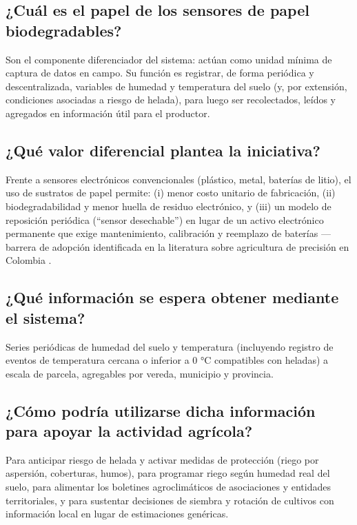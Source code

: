 \documentclass[11pt,a4paper]{article}
\begin{document}
\subsection{¿Cuál es el papel de los sensores de papel biodegradables?}
Son el componente diferenciador del sistema: actúan como unidad mínima de captura de datos en campo. Su función es registrar, de forma periódica y descentralizada, variables de humedad y temperatura del suelo (y, por extensión, condiciones asociadas a riesgo de helada), para luego ser recolectados, leídos y agregados en información útil para el productor.

\subsection{¿Qué valor diferencial plantea la iniciativa?}
Frente a sensores electrónicos convencionales (plástico, metal, baterías de litio), el uso de sustratos de papel permite: (i) menor costo unitario de fabricación, (ii) biodegradabilidad y menor huella de residuo electrónico, y (iii) un modelo de reposición periódica (``sensor desechable'') en lugar de un activo electrónico permanente que exige mantenimiento, calibración y reemplazo de baterías --- barrera de adopción identificada en la literatura sobre agricultura de precisión en Colombia \citep{scielo2022precision}.

\subsection{¿Qué información se espera obtener mediante el sistema?}
Series periódicas de humedad del suelo y temperatura (incluyendo registro de eventos de temperatura cercana o inferior a 0 °C compatibles con heladas) a escala de parcela, agregables por vereda, municipio y provincia.

\subsection{¿Cómo podría utilizarse dicha información para apoyar la actividad agrícola?}
Para anticipar riesgo de helada y activar medidas de protección (riego por aspersión, coberturas, humos), para programar riego según humedad real del suelo, para alimentar los boletines agroclimáticos de asociaciones y entidades territoriales, y para sustentar decisiones de siembra y rotación de cultivos con información local en lugar de estimaciones genéricas.

\end{document}
